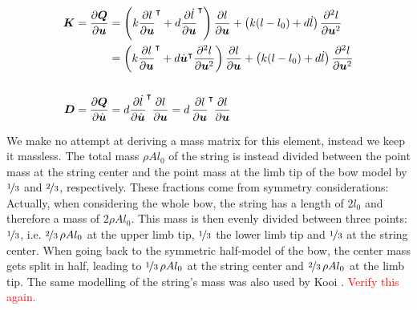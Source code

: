 \begin{align}
\boldsymbol{K} = \frac{\partial\boldsymbol{Q}}{\partial\boldsymbol{u}} &= \left(k\frac{\partial l}{\partial\boldsymbol{u}}^\intercal + d\frac{\partial\dot{l}}{\partial\boldsymbol{u}}^\intercal\right)\frac{\partial l}{\partial\boldsymbol{u}} + \left(k(l - l_{0}) + d\dot{l}\right)\frac{\partial^2 l}{\partial\boldsymbol{u}^2} \notag \\
&= \left(k\frac{\partial l}{\partial\boldsymbol{u}}^\intercal + d\dot{\boldsymbol{u}}^\intercal\frac{\partial^2 l}{\partial\boldsymbol{u}^2}\right)\frac{\partial l}{\partial\boldsymbol{u}} + \left(k(l - l_{0}) + d\dot{l}\right)\frac{\partial^2 l}{\partial\boldsymbol{u}^2} \\
\notag \\
\boldsymbol{D} = \frac{\partial\boldsymbol{Q}}{\partial\dot{\boldsymbol{u}}} &= d\frac{\partial\dot{l}}{\partial\dot{\boldsymbol{u}}}^\intercal\frac{\partial l}{\partial\boldsymbol{u}} = d\,\frac{\partial l}{\partial\boldsymbol{u}}^\intercal\frac{\partial l}{\partial\boldsymbol{u}}
\end{align}

We make no attempt at deriving a mass matrix for this element, instead we keep it massless.
The total mass $\rho A l_{0}$ of the string is instead divided between the point mass at the string center and the point mass at the limb tip of the bow model by $\nicefrac{1}{3}$ and $\nicefrac{2}{3}$, respectively.
These fractions come from symmetry considerations: Actually, when considering the whole bow, the string has a length of $2l_{0}$ and therefore a mass of $2\rho A l_{0}$.
This mass is then evenly divided between three points: $\nicefrac{1}{3}$, i.e. $\nicefrac{2}{3}\,\rho A l_{0}$ at the upper limb tip, $\nicefrac{1}{3}$ the lower limb tip and $\nicefrac{1}{3}$ at the string center.
When going back to the symmetric half-model of the bow, the center mass gets split in half, leading to $\nicefrac{1}{3}\,\rho A l_{0}$ at the string center and $\nicefrac{2}{3}\,\rho A l_{0}$ at the limb tip.
The same modelling of the string's mass was also used by Kooi \cite{bib:kooi81}. \textcolor{red}{Verify this again.}


